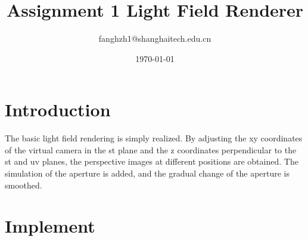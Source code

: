 \documentclass[letterpaper,12pt]{article}
\begin{document}
\title{Assignment 1 Light Field Renderer}
\author{fanghzh1@shanghaitech.edu.cn}
\date{\today}
\maketitle


\tableofcontents
\section{Introduction}
The basic light field rendering is simply realized. By adjusting the xy coordinates of the virtual camera in the st plane and the z coordinates perpendicular to the st and uv planes, the perspective images at different positions are obtained. The simulation of the aperture is added, and the gradual change of the aperture is smoothed.
\section{Implement}
\end{document}

